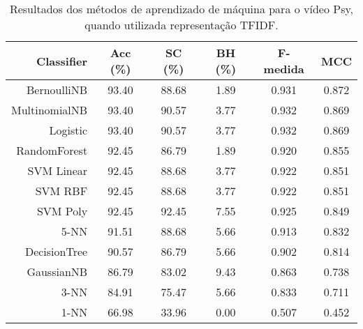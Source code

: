 \begin{table}[!htb]
\centering
\caption{Resultados dos métodos de aprendizado de máquina para o vídeo Psy, quando utilizada representação TFIDF.}
\label{tab:Psy-tfidf}
\begin{tabular}{r|c|c|c|c|c}
\hline\hline
Classifier & Acc (\%) & SC (\%) & BH (\%) & F-medida & MCC \\ \hline
BernoulliNB & 93.40 & 88.68 & 1.89 & 0.931 & 0.872 & \\
MultinomialNB & 93.40 & 90.57 & 3.77 & 0.932 & 0.869 & \\
Logistic & 93.40 & 90.57 & 3.77 & 0.932 & 0.869 & \\
RandomForest & 92.45 & 86.79 & 1.89 & 0.920 & 0.855 & \\
SVM Linear & 92.45 & 88.68 & 3.77 & 0.922 & 0.851 & \\
SVM RBF & 92.45 & 88.68 & 3.77 & 0.922 & 0.851 & \\
SVM Poly & 92.45 & 92.45 & 7.55 & 0.925 & 0.849 & \\
5-NN & 91.51 & 88.68 & 5.66 & 0.913 & 0.832 & \\
DecisionTree & 90.57 & 86.79 & 5.66 & 0.902 & 0.814 & \\
GaussianNB & 86.79 & 83.02 & 9.43 & 0.863 & 0.738 & \\
3-NN & 84.91 & 75.47 & 5.66 & 0.833 & 0.711 & \\
1-NN & 66.98 & 33.96 & 0.00 & 0.507 & 0.452 & \\
\hline\hline
\end{tabular}
\end{table}
